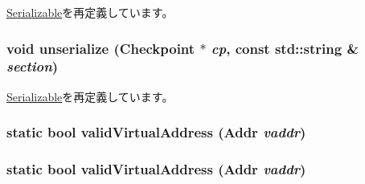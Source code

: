 \hyperlink{classSerializable_af100c4e9feabf3cd918619c88c718387}{Serializable}を再定義しています。\hypertarget{classMipsISA_1_1TLB_af22e5d6d660b97db37003ac61ac4ee49}{
\subsubsection[{unserialize}]{\setlength{\rightskip}{0pt plus 5cm}void unserialize ({\bf Checkpoint} $\ast$ {\em cp}, \/  const std::string \& {\em section})}}
\label{classMipsISA_1_1TLB_af22e5d6d660b97db37003ac61ac4ee49}


\hyperlink{classSerializable_af100c4e9feabf3cd918619c88c718387}{Serializable}を再定義しています。\hypertarget{classMipsISA_1_1TLB_a3e576c3e0d39dfca708baea44ebf0617}{
\subsubsection[{validVirtualAddress}]{\setlength{\rightskip}{0pt plus 5cm}static bool validVirtualAddress ({\bf Addr} {\em vaddr})}}
\label{classMipsISA_1_1TLB_a3e576c3e0d39dfca708baea44ebf0617}
\hypertarget{classMipsISA_1_1TLB_a3e576c3e0d39dfca708baea44ebf0617}{
\subsubsection[{validVirtualAddress}]{\setlength{\rightskip}{0pt plus 5cm}static bool validVirtualAddress ({\bf Addr} {\em vaddr})}}
\label{classMipsISA_1_1TLB_a3e576c3e0d39dfca708baea44ebf0617}


